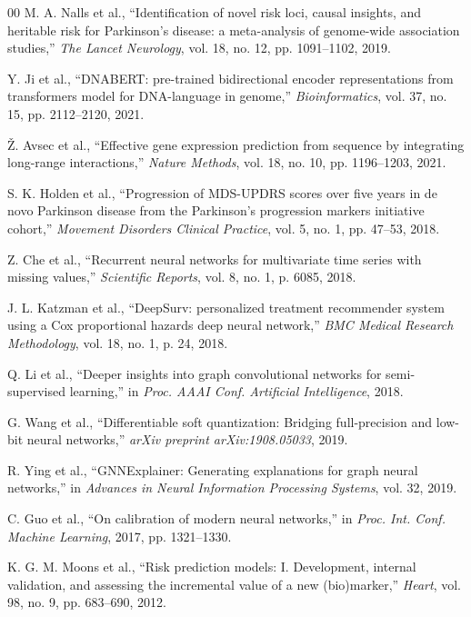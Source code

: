 \documentclass[conference]{IEEEtran}
\begin{document}
\begin{thebibliography}{00}
M. A. Nalls et al., ``Identification of novel risk loci, causal insights, and heritable risk for Parkinson's disease: a meta-analysis of genome-wide association studies,'' \textit{The Lancet Neurology}, vol. 18, no. 12, pp. 1091--1102, 2019.

Y. Ji et al., ``DNABERT: pre-trained bidirectional encoder representations from transformers model for DNA-language in genome,'' \textit{Bioinformatics}, vol. 37, no. 15, pp. 2112--2120, 2021.

Ž. Avsec et al., ``Effective gene expression prediction from sequence by integrating long-range interactions,'' \textit{Nature Methods}, vol. 18, no. 10, pp. 1196--1203, 2021.

S. K. Holden et al., ``Progression of MDS-UPDRS scores over five years in de novo Parkinson disease from the Parkinson's progression markers initiative cohort,'' \textit{Movement Disorders Clinical Practice}, vol. 5, no. 1, pp. 47--53, 2018.

Z. Che et al., ``Recurrent neural networks for multivariate time series with missing values,'' \textit{Scientific Reports}, vol. 8, no. 1, p. 6085, 2018.

J. L. Katzman et al., ``DeepSurv: personalized treatment recommender system using a Cox proportional hazards deep neural network,'' \textit{BMC Medical Research Methodology}, vol. 18, no. 1, p. 24, 2018.

Q. Li et al., ``Deeper insights into graph convolutional networks for semi-supervised learning,'' in \textit{Proc. AAAI Conf. Artificial Intelligence}, 2018.

G. Wang et al., ``Differentiable soft quantization: Bridging full-precision and low-bit neural networks,'' \textit{arXiv preprint arXiv:1908.05033}, 2019.

R. Ying et al., ``GNNExplainer: Generating explanations for graph neural networks,'' in \textit{Advances in Neural Information Processing Systems}, vol. 32, 2019.

C. Guo et al., ``On calibration of modern neural networks,'' in \textit{Proc. Int. Conf. Machine Learning}, 2017, pp. 1321--1330.

K. G. M. Moons et al., ``Risk prediction models: I. Development, internal validation, and assessing the incremental value of a new (bio)marker,'' \textit{Heart}, vol. 98, no. 9, pp. 683--690, 2012.


\end{thebibliography}
\end{document}
